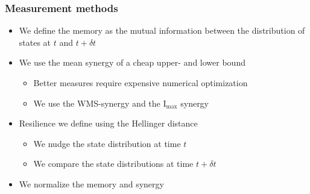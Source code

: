 \documentclass[hyperref={pdfpagelabels=false}]{beamer}
\begin{document}
\begin{frame}
\frametitle{Measurement methods}
\begin{itemize}
\item We define the memory as the mutual information between the distribution of states at $t$ and $t + \delta t$
\item We use the mean synergy of a cheap upper- and lower bound
\begin{itemize}
\item Better measures require expensive numerical optimization
\item We use the WMS-synergy and the $\mathrm{I}_\mathrm{max}$ synergy
\end{itemize}
\item Resilience we define using the Hellinger distance
\begin{itemize}
\item We nudge the state distribution at time $t$
\item We compare the state distributions at time $t + \delta t$
\end{itemize}
\item We normalize the memory and synergy
\end{itemize}
\end{frame}
\end{document}
